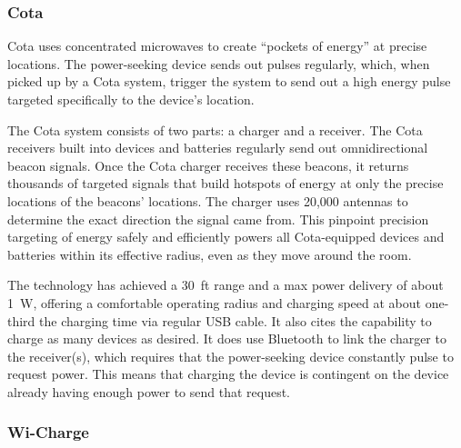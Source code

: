 \subsubsection{Cota}

Cota uses concentrated microwaves to create ``pockets of energy'' at precise locations. The power-seeking device sends out pulses regularly, which, when picked up by a Cota system, trigger the system to send out a high energy pulse targeted specifically to the device's location.

The Cota system consists of two parts: a charger and a receiver. The Cota receivers built into devices and batteries regularly send out omnidirectional beacon signals. Once the Cota charger receives these beacons, it returns thousands of targeted signals that build hotspots of energy at only the precise locations of the beacons' locations. The charger uses 20,000 antennas to determine the exact direction the signal came from. This pinpoint precision targeting of energy safely and efficiently powers all Cota-equipped devices and batteries within its effective radius, even as they move around the room.

The technology has achieved a 30~ft range and a max power delivery of about 1~W, offering a comfortable operating radius and charging speed at about one-third the charging time via regular USB cable. It also cites the capability to charge as many devices as desired. It does use Bluetooth to link the charger to the receiver(s), which requires that the power-seeking device constantly pulse to request power. This means that charging the device is contingent on the device already having enough power to send that request.

\subsubsection{Wi-Charge}


